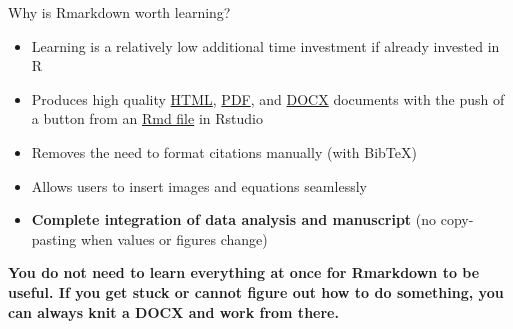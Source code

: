 \documentclass[ignorenonframetext,]{beamer}
\providecommand{\tightlist}{%
\setlength{\itemsep}{0pt}\setlength{\parskip}{0pt}}
\begin{document}
\begin{frame}{Why is Rmarkdown worth learning?}

\begin{itemize}
\tightlist
\item
  Learning is a relatively low additional time investment if already
  invested in R
\item
  Produces high quality
  \href{https://stirlingcodingclub.github.io/Manuscripts_in_Rmarkdown/ms_history/ms_final.html}{HTML},
  \href{https://github.com/StirlingCodingClub/Manuscripts_in_Rmarkdown/blob/224e0f3673aece576d5c859f5409b6c9b68a5565/ms.pdf}{PDF},
  and
  \href{https://github.com/StirlingCodingClub/Manuscripts_in_Rmarkdown/raw/224e0f3673aece576d5c859f5409b6c9b68a5565/ms.docx}{DOCX}
  documents with the push of a button from an
  \href{https://github.com/StirlingCodingClub/Manuscripts_in_Rmarkdown/blob/master/ms.Rmd}{Rmd
  file} in Rstudio
\item
  Removes the need to format citations manually (with BibTeX)
\item
  Allows users to insert images and equations seamlessly
\item
  \textbf{Complete integration of data analysis and manuscript} (no
  copy-pasting when values or figures change)
\end{itemize}

\textbf{You do not need to learn everything at once for Rmarkdown to be
useful. If you get stuck or cannot figure out how to do something, you
can always knit a DOCX and work from there.}

\end{frame}
\end{document}
